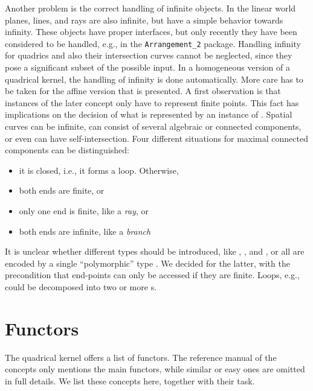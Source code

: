 Another problem is the correct handling of infinite objects. In the linear
world planes, lines, and rays are also infinite, but have a
simple behavior towards infinity. These objects have proper interfaces,
but only recently they have been considered to be handled, e.g.,
in the {\tt Arrangement\_2} package. 
Handling infinity for quadrics and also their intersection curves cannot
be neglected, since they pose a significant subset of the possible input.
In a homogeneous version of a quadrical kernel, the handling of infinity
is done automatically. More care has to be taken 
for the affine version that is presented.
A first observation is that instances of the later concept 
 only have to represent finite points.
This fact has implications on the decision of what is represented
by an instance of .
Spatial curves can be infinite,
can consist of several algebraic or connected components, or even can have 
self-intersection. Four different situations for maximal connected
components can be distinguished: 
\begin{itemize}
\item it is closed, i.e., it forms a loop. Otherwise,
\item both ends are finite, or
\item only one end is finite, like a {\em ray}, or 
\item both ends are infinite, like a {\em branch}
\end{itemize}
It is unclear
whether different types should be introduced, like ,
, 
 and , or
all are encoded by a single ``polymorphic'' type . 
We decided for the latter, with the precondition
that end-points can only be accessed if they are finite. Loops, e.g.,
could be decomposed into two or more s.

\section{Functors}

The quadrical kernel offers a list of functors. 
The reference manual of the concepts only mentions
the main functors, while similar or easy ones are omitted in full details.
We list these concepts here, together with their task.

